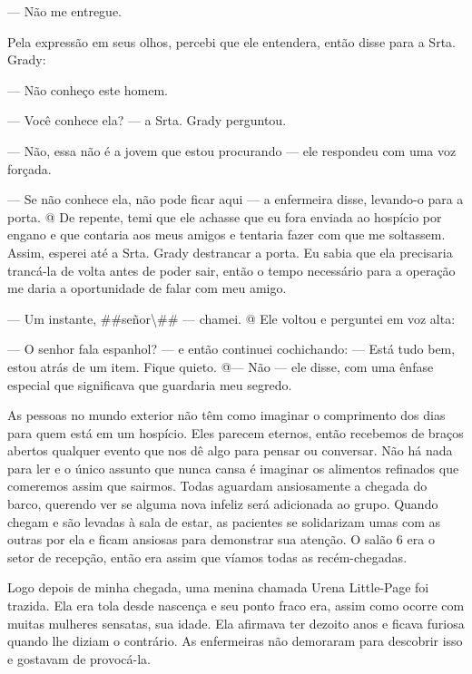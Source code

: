 --- Não me entregue.

Pela expressão em seus olhos, percebi que ele entendera, então disse
para a Srta. Grady:

--- Não conheço este homem.

--- Você conhece ela? --- a Srta. Grady perguntou.

--- Não, essa não é a jovem que estou procurando --- ele respondeu com
uma voz forçada.

--- Se não conhece ela, não pode ficar aqui --- a enfermeira disse,
levando-o para a porta. @ De repente, temi que ele achasse que eu fora
enviada ao hospício por engano e que contaria aos meus amigos e tentaria
fazer com que me soltassem. Assim, esperei até a Srta. Grady destrancar
a porta. Eu sabia que ela precisaria trancá-la de volta antes de poder
sair, então o tempo necessário para a operação me daria a oportunidade
de falar com meu amigo.

--- Um instante, \#\#señor\textbackslash{}\#\# --- chamei. @ Ele voltou
e perguntei em voz alta:

--- O senhor fala espanhol? --- e então continuei cochichando: --- Está
tudo bem, estou atrás de um item. Fique quieto. @--- Não --- ele disse,
com uma ênfase especial que significava que guardaria meu segredo.

As pessoas no mundo exterior não têm como imaginar o comprimento dos
dias para quem está em um hospício. Eles parecem eternos, então
recebemos de braços abertos qualquer evento que nos dê algo para pensar
ou conversar. Não há nada para ler e o único assunto que nunca cansa é
imaginar os alimentos refinados que comeremos assim que sairmos. Todas
aguardam ansiosamente a chegada do barco, querendo ver se alguma nova
infeliz será adicionada ao grupo. Quando chegam e são levadas à sala de
estar, as pacientes se solidarizam umas com as outras por ela e ficam
ansiosas para demonstrar sua atenção. O salão 6 era o setor de recepção,
então era assim que víamos todas as recém-chegadas.

Logo depois de minha chegada, uma menina chamada Urena Little-Page foi
trazida. Ela era tola desde nascença e seu ponto fraco era, assim como
ocorre com muitas mulheres sensatas, sua idade. Ela afirmava ter dezoito
anos e ficava furiosa quando lhe diziam o contrário. As enfermeiras não
demoraram para descobrir isso e gostavam de provocá-la.

